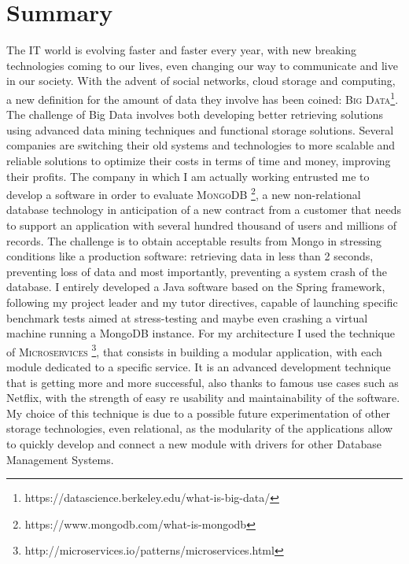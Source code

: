 \chapter*{Summary} %
\label{Summary}


The IT world is evolving faster and faster every year, with new breaking technologies coming to our lives, even changing our way to communicate and live in our society. With the advent of social networks, cloud storage and computing, a new definition for the amount of data they involve has been coined: \textsc{Big Data}\footnote{https://datascience.berkeley.edu/what-is-big-data/}.
The challenge of Big Data involves both developing better retrieving solutions using advanced data mining techniques and functional storage solutions.
Several companies are switching their old systems and technologies to more scalable and reliable solutions to optimize their costs in terms of time and money, improving their profits.
The company in which I am actually working entrusted me to develop a software in order to evaluate \textsc{MongoDB} \footnote{https://www.mongodb.com/what-is-mongodb}, a new non-relational database technology in anticipation of a new  contract from a customer that needs to support an application with several hundred thousand of users and millions of records.
The challenge is to obtain acceptable results from Mongo in stressing conditions like a production software: retrieving data in less than 2 seconds, preventing loss of data and most importantly, preventing a system crash of the database.
I entirely developed a Java software based on the Spring framework, following my project leader and my tutor directives, capable of launching specific benchmark tests aimed at stress-testing and maybe even crashing a virtual machine running a MongoDB instance.
For my architecture I used the technique of \textsc{Microservices} \footnote{http://microservices.io/patterns/microservices.html}, that consists in building a modular application, with each module dedicated to a specific service. It is an advanced development technique that is getting more and more successful, also thanks to famous use cases such as Netflix, with the strength of easy re usability and maintainability of the software.
My choice of this technique is due to a possible future experimentation of other storage technologies, even relational, as the modularity of the applications allow to quickly develop and connect a new module with drivers for other Database Management Systems.
